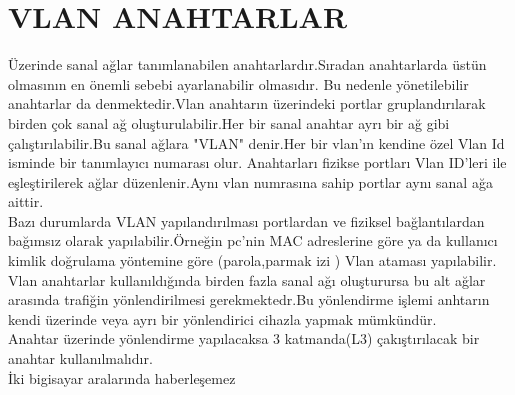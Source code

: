   \section*{VLAN ANAHTARLAR}
  Üzerinde sanal  ağlar tanımlanabilen anahtarlardır.Sıradan anahtarlarda üstün olmasının en önemli sebebi ayarlanabilir olmasıdır.
  Bu  nedenle yönetilebilir anahtarlar da denmektedir.Vlan anahtarın üzerindeki portlar gruplandırılarak birden çok sanal ağ oluşturulabilir.Her bir sanal anahtar ayrı bir ağ gibi çalıştırılabilir.Bu sanal ağlara "VLAN" denir.Her bir vlan'ın kendine özel Vlan Id isminde bir tanımlayıcı numarası olur.
  Anahtarları fizikse portları Vlan ID'leri ile eşleştirilerek ağlar düzenlenir.Aynı vlan numrasına sahip portlar aynı sanal ağa aittir.\\
  Bazı durumlarda VLAN yapılandırılması portlardan ve fiziksel bağlantılardan bağımsız olarak yapılabilir.Örneğin pc'nin MAC adreslerine göre ya da kullanıcı kimlik doğrulama yöntemine göre (parola,parmak izi ) Vlan ataması  yapılabilir.\\
  Vlan anahtarlar kullanıldığında birden fazla sanal ağı oluşturursa bu alt ağlar arasında trafiğin yönlendirilmesi gerekmektedr.Bu yönlendirme işlemi anhtarın kendi üzerinde veya ayrı bir yönlendirici cihazla yapmak mümkündür.\\
  Anahtar üzerinde yönlendirme yapılacaksa 3 katmanda(L3) çakıştırılacak bir anahtar kullanılmalıdır.\\
  İki bigisayar aralarında haberleşemez 